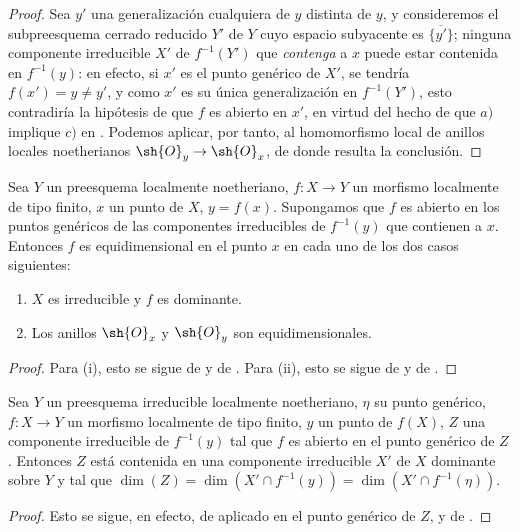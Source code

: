 \begin{proof}
Sea $y'$ una generalización cualquiera de $y$ distinta de $y$, y consideremos el subpreesquema cerrado reducido $Y'$ de $Y$ cuyo espacio subyacente es $\overline{\{y'\}}$; ninguna componente irreducible $X'$ de $f^{-1}(Y')$ que \emph{contenga} a $x$ puede estar contenida en $f^{-1}(y)$: en efecto, si $x'$ es el punto genérico de $X'$, se tendría $f(x')=y\neq y'$, y como $x'$ es su única generalización en $f^{-1}(Y')$, esto contradiría la hipótesis de que $f$ es abierto en $x'$, en virtud del hecho de que $a)$ implique $c)$ en .
Podemos aplicar, por tanto,  al homomorfismo local de anillos locales noetherianos $\sh{O}_y\to\sh{O}_x$, de donde resulta la conclusión.
\end{proof}

\begin{corollary}[14.2.2]
\label{IV.14.2.2}
Sea $Y$ un preesquema localmente noetheriano, $f:X\to Y$ un morfismo localmente de tipo finito, $x$ un punto de $X$, $y=f(x)$.
Supongamos que $f$ es abierto en los puntos genéricos de las componentes irreducibles de $f^{-1}(y)$ que contienen a $x$.
Entonces $f$ es equidimensional en el punto $x$ en cada uno de los dos casos siguientes:
\begin{enumerate}[label=(\roman*)]
  \item $X$ es irreducible y $f$ es dominante.
  \item Los anillos $\sh{O}_x$ y $\sh{O}_y$ son equidimensionales.
\end{enumerate}
\end{corollary}

\begin{proof}
Para (i), esto se sigue de  y de .
Para (ii), esto se sigue de  y de .
\end{proof}

\begin{proposition}[14.2.3]
\label{IV.14.2.3}
Sea $Y$ un preesquema irreducible localmente noetheriano, $\eta$ su punto genérico, $f:X\to Y$ un morfismo localmente de tipo finito, $y$ un punto de $f(X)$, $Z$ una componente irreducible de $f^{-1}(y)$ tal que $f$ es abierto en el punto genérico de $Z$.
Entonces $Z$ está contenida en una componente irreducible $X'$ de $X$ dominante sobre $Y$ y tal que $\dim(Z)=\dim(X'\cap f^{-1}(y))=\dim(X'\cap f^{-1}(\eta))$.
\end{proposition}

\begin{proof}
Esto se sigue, en efecto, de  aplicado en el punto genérico de $Z$, y de .
\end{proof}


